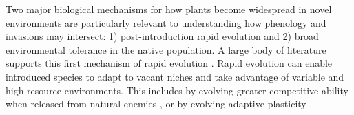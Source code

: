 \documentclass[11pt]{article}\usepackage[]{graphicx}\usepackage[]{color}
\begin{document}
Two major biological mechanisms for how plants become widespread in novel environments are particularly relevant to understanding how phenology and invasions may intersect: 1) post-introduction rapid evolution and 2) broad environmental tolerance in the native population. A large body of literature supports this first mechanism of rapid evolution \parencite[e.g.,][]{Reznick2001, Prentis2008,Colautti2015,Lee2002invasion,Clements2011}. Rapid evolution can enable introduced species to adapt to vacant niches and take advantage of variable and high-resource environments.  This includes by evolving greater competitive ability when released from natural enemies \parencites[i.e., enemy release hypothesis]{Blossey1995,Bossdorf2005}[though this hypothesis is likely less explanatory than is often assumed][]{Colautti2004}, or by evolving adaptive plasticity \parencite{Richards2006}. %
\end{document}
